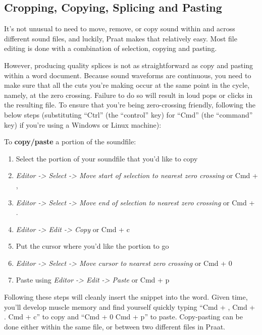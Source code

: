 \documentclass[11pt]{article}
\def\tightlist{}
\begin{document}
\hypertarget{cropping-copying-splicing-and-pasting}{%
\subsection{Cropping, Copying, Splicing and
Pasting}\label{cropping-copying-splicing-and-pasting}}

\label{sec:cropcopy}

It's not unusual to need to move, remove, or copy sound within and
across different sound files, and luckily, Praat makes that relatively
easy. Most file editing is done with a combination of selection, copying
and pasting.

However, producing quality splices is not as straightforward as copy and
pasting within a word document. Because sound waveforms are continuous,
you need to make sure that all the cuts you're making occur at the same
point in the cycle, namely, at the zero crossing. Failure to do so will
result in loud pops or clicks in the resulting file. To ensure that
you're being zero-crossing friendly, following the below steps
(substituting ``Ctrl'' (the ``control'' key) for ``Cmd'' (the
``command'' key) if you're using a Windows or Linux machine):

To \textbf{copy/paste} a portion of the soundfile:

\begin{enumerate}
\def\labelenumi{\arabic{enumi}.}
\tightlist
\item
  Select the portion of your soundfile that you'd like to copy
\item
  \emph{Editor -\textgreater{} Select -\textgreater{} Move start of
  selection to nearest zero crossing} or Cmd + ,
\item
  \emph{Editor -\textgreater{} Select -\textgreater{} Move end of
  selection to nearest zero crossing} or Cmd + .
\item
  \emph{Editor -\textgreater{} Edit -\textgreater{} Copy} or Cmd + c
\item
  Put the cursor where you'd like the portion to go
\item
  \emph{Editor -\textgreater{} Select -\textgreater{} Move cursor to
  nearest zero crossing} or Cmd + 0
\item
  Paste using \emph{Editor -\textgreater{} Edit -\textgreater{} Paste}
  or Cmd + p
\end{enumerate}

Following these steps will cleanly insert the snippet into the word.
Given time, you'll develop muscle memory and find yourself quickly
typing ``Cmd + , Cmd + . Cmd + c'' to copy and ``Cmd + 0 Cmd + p'' to
paste. Copy-pasting can be done either within the same file, or between
two different files in Praat.
\end{document}
